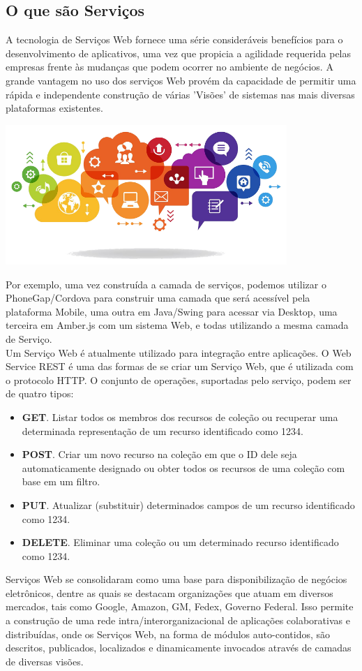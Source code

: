 \documentclass[a4paper,11pt]{article}
\begin{document}
\subsection{O que são Serviços}
A tecnologia de Serviços Web fornece uma série consideráveis benefícios para o desenvolvimento de aplicativos, uma vez que propicia a agilidade requerida pelas empresas frente às mudanças que podem ocorrer no ambiente de negócios. A grande vantagem no uso dos serviços Web provém da capacidade de permitir uma rápida e independente construção de várias 'Visões' de sistemas nas mais diversas plataformas existentes. 
\begin{center} 
\includegraphics[width=0.8\textwidth]{servicos.png}
\end{center}
Por exemplo, uma vez construída a camada de serviços, podemos utilizar o PhoneGap/Cordova para construir uma camada que será acessível pela plataforma Mobile, uma outra em Java/Swing para acessar via Desktop, uma terceira em Amber.js com um sistema Web, e todas utilizando a mesma camada de Serviço. \\[2mm]
Um Serviço Web é atualmente utilizado para integração entre aplicações. O Web Service REST é uma das formas de se criar um Serviço Web, que é utilizada com o protocolo HTTP. O conjunto de operações, suportadas pelo serviço, podem ser de quatro tipos: 
\begin{itemize}
  \item \textbf{GET}. Listar todos os membros dos recursos de coleção ou recuperar uma 
  determinada representação de um recurso identificado como 1234.
  \item \textbf{POST}. Criar um novo recurso na coleção em que o ID dele seja automaticamente designado ou obter todos os recursos de uma coleção com base em um filtro.
  \item \textbf{PUT}. Atualizar (substituir) determinados campos de um recurso identificado como 1234.
  \item \textbf{DELETE}. Eliminar uma coleção ou um determinado recurso identificado como 1234.
\end{itemize}
Serviços Web se consolidaram como uma base para disponibilização de negócios eletrônicos, dentre as quais se destacam organizações que atuam em diversos mercados, tais como Google, Amazon, GM, Fedex, Governo Federal. Isso permite a construção de uma rede intra/interorganizacional de aplicações colaborativas e distribuídas, onde os Serviços Web, na forma de módulos auto-contidos, são descritos, publicados, localizados e dinamicamente invocados através de camadas de diversas visões.
\end{document}
